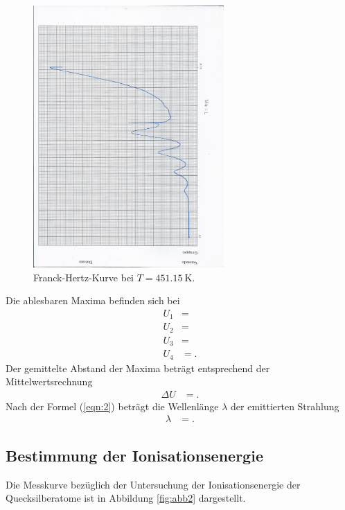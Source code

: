 \begin{figure}[H]
  \centering
  \includegraphics[height = 10cm]{messdaten/daten-4.jpg}
  \caption{Franck-Hertz-Kurve bei $T = \SI{451.15}{\kelvin}$.}
  \label{fig:abb1}
\end{figure}

Die ablesbaren Maxima befinden sich bei
\begin{align*}
  U_1 &=  \\
  U_2 &=  \\
  U_3 &=  \\
  U_4 &= .
\end{align*}
Der gemittelte Abstand der Maxima beträgt entsprechend der Mittelwertsrechnung
\begin{align*}
  \Delta U &= .
\end{align*}
Nach der Formel (\ref{eqn:2}) beträgt die Wellenlänge $\lambda$ der emittierten Strahlung
\begin{align*}
  \lambda &= .
\end{align*}

\subsection{Bestimmung der Ionisationsenergie}
Die Messkurve bezüglich der Untersuchung der Ionisationsenergie der Quecksilberatome ist in Abbildung \ref{fig:abb2} dargestellt.

